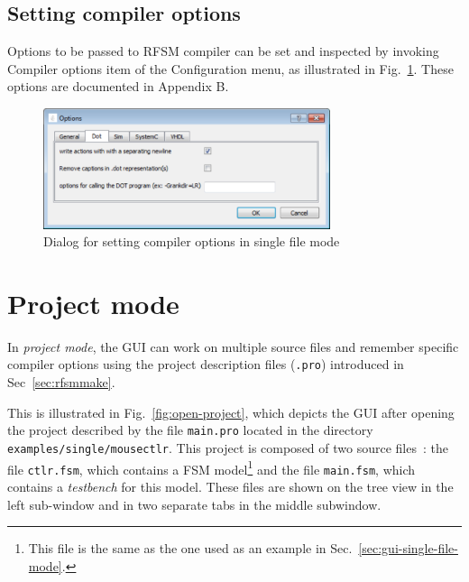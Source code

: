 \subsection{Setting compiler options}
\label{sec:gui-setting-options}

Options to be passed to RFSM compiler can be set and inspected by invoking \textsf{Compiler options} item of the
\textsf{Configuration} menu, as illustrated in Fig.~\ref{fig:gui-compiler-options}. These options are
documented in Appendix B.

\begin{figure}[h]
  \centering
  \includegraphics[width=0.75\textwidth]{figs/gui/options}
  \caption{Dialog for setting compiler options in single file mode}
  \label{fig:gui-compiler-options}
\end{figure}

\section{Project mode}
\label{sec:gui-project-mode}

In \emph{project mode}, the GUI can work on multiple source files and remember specific compiler
options using the project description files (\verb|.pro|) introduced in Sec~\ref{sec:rfsmmake}.

This is illustrated in Fig.~\ref{fig:open-project}, which depicts the GUI after opening the project
described by the file \verb|main.pro| located in the directory \texttt{examples/single/mousectlr}.
This project is composed of two source files~: the file \verb|ctlr.fsm|, which contains a FSM
model\footnote{This file is the same as the one used as an example in
  Sec.~\ref{sec:gui-single-file-mode}.} and the file \verb|main.fsm|, which contains a
\emph{testbench} for this model. These files are shown on the tree view in the left sub-window and
in two separate tabs in the middle subwindow. 

